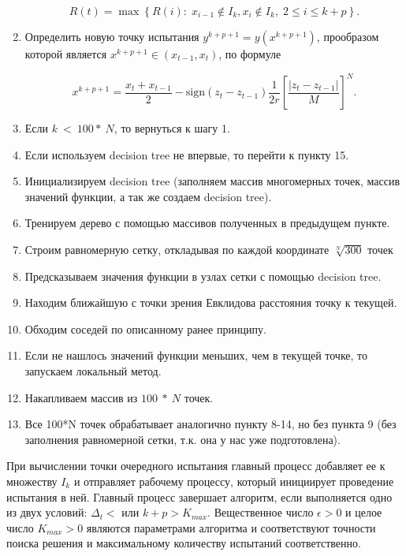 \documentclass{svproc}
\begin{document}
\begin{enumerate}
\begin{displaymath}
R\left(t\right)=\max{\left\{R\left(i\right):\;x_{i-1}\notin I_k,x_i\notin I_k,\;2\le i\le k+p\right\}}.
\end{displaymath}

\item  Определить новую точку испытания $y^{k+p+1}=y\left(x^{k+p+1}\right)$, прообразом которой является $x^{k+p+1}\in\left(x_{t-1},x_t\right)$, по формуле

\begin{displaymath}
x^{k+p+1}=\frac{x_t+x_{t-1}}{2}-\mathrm{sign}\left(z_t-z_{t-1}\right)\frac{1}{2r}\left[\frac{\left|z_t-z_{t-1}\right|}{M}\right]^N.
\end{displaymath}

\item 	Если $ k\ <\ 100\ast\ N$, то вернуться к шагу 1.

\item 	Если используем decision tree не впервые, то перейти к пункту 15.

\item 	Инициализируем decision tree (заполняем массив многомерных точек, массив значений функции, а так же создаем decision tree). %
\item 	Тренируем дерево с помощью массивов полученных в предыдущем пункте.

\item 	Строим равномерную сетку, откладывая по каждой координате $\sqrt[N]{300}$ точек %
\item 	Предсказываем значения функции в узлах сетки с помощью decision tree.

\item 	Находим ближайшую с точки зрения Евклидова расстояния точку к текущей. %
\item 	Обходим соседей по описанному ранее принципу.

\item 	Если не нашлось значений функции меньших, чем в текущей точке, то запускаем локальный метод.

\item 	Накапливаем массив из $100\ \ast\ N$ точек. %
\item 	Все 100*N точек обрабатывает аналогично пункту 8-14, но без пункта 9 (без заполнения равномерной сетки, т.к. она у нас уже подготовлена).

\end{enumerate}

При вычислении точки очередного испытания главный процесс добавляет ее к множеству $I_k$ и отправляет рабочему процессу, который инициирует проведение испытания в ней.
Главный процесс завершает алгоритм, если выполняется одно из двух условий: $\Delta_t<$ или $k+p>K_{max}$.
Вещественное число $\epsilon>0$ и целое число $K_{max}>0$ являются параметрами алгоритма и соответствуют точности поиска решения и максимальному количеству испытаний соответственно.
\end{document}
